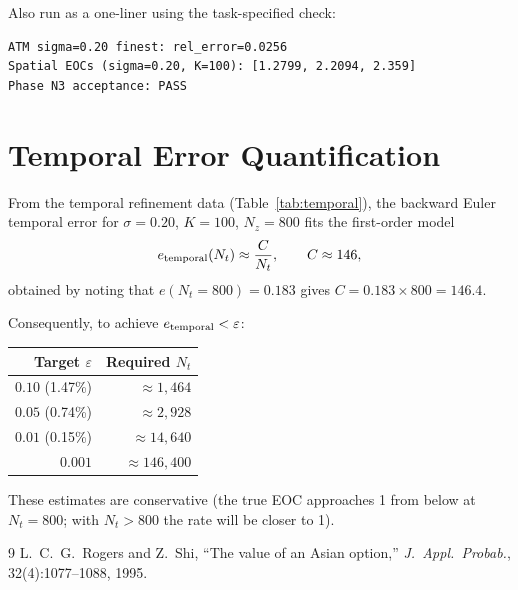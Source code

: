 \documentclass[11pt,a4paper]{article}
\newcommand{\Nz}{N_z}
\newcommand{\Nt}{N_t}
\begin{document}
Also run as a one-liner using the task-specified check:
\begin{verbatim}
ATM sigma=0.20 finest: rel_error=0.0256
Spatial EOCs (sigma=0.20, K=100): [1.2799, 2.2094, 2.359]
Phase N3 acceptance: PASS
\end{verbatim}

\section{Temporal Error Quantification}
\label{app:temporal}

From the temporal refinement data (Table~\ref{tab:temporal}), the
backward Euler temporal error for $\sigma = 0.20$, $K = 100$,
$\Nz = 800$ fits the first-order model
\[
  e_{\rm temporal}(\Nt) \approx \frac{C}{\Nt},
  \qquad
  C \approx 146,
\]
obtained by noting that $e(\Nt=800) = 0.183$ gives
$C = 0.183 \times 800 = 146.4$.

Consequently, to achieve $e_{\rm temporal} < \varepsilon$:
\begin{center}
\begin{tabular}{rr}
\toprule
Target $\varepsilon$ & Required $\Nt$ \\
\midrule
$0.10$ (1.47\%) & $\approx 1{,}464$ \\
$0.05$ (0.74\%) & $\approx 2{,}928$ \\
$0.01$ (0.15\%) & $\approx 14{,}640$ \\
$0.001$         & $\approx 146{,}400$ \\
\bottomrule
\end{tabular}
\end{center}
These estimates are conservative (the true EOC approaches 1 from below
at $\Nt = 800$; with $\Nt > 800$ the rate will be closer to 1).

\begin{thebibliography}{9}
L.~C.~G.~Rogers and Z.~Shi,
``The value of an Asian option,''
\textit{J.\ Appl.\ Probab.}, 32(4):1077--1088, 1995.
\end{thebibliography}
\end{document}
